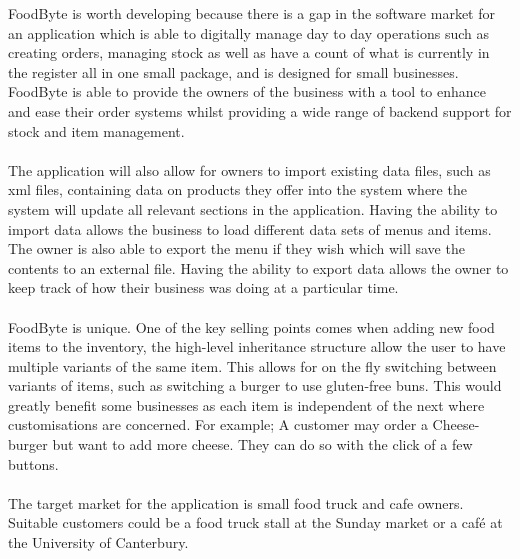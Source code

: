 FoodByte is worth developing because there is a gap in the software market for an application which is able to digitally manage day to day operations such as creating orders, managing stock as well as have a count of what is currently in the register all in one small package, and is designed for small businesses. FoodByte is able to provide the owners of the business with a tool to enhance and ease their order systems whilst providing a wide range of backend support for stock and item management.
\\ \\
The application will also allow for owners to import existing data files, such as xml files, containing data on products they offer into the system where the system will update all relevant sections in the application. Having the ability to import data allows the business to load different data sets of menus and items. The owner is also able to export the menu if they wish which will save the contents to an external file. Having the ability to export data allows the owner to keep track of how their business was doing at a particular time.
\\ \\
FoodByte is unique. One of the key selling points comes when adding new food items to the inventory, the high-level inheritance structure allow the user to have multiple variants of the same item. This allows for on the fly switching between variants of items, such as switching a burger to use gluten-free buns. This would greatly benefit some businesses as each item is independent of the next where customisations are concerned. For example; A customer may order a Cheese-burger but want to add more cheese. They can do so with the click of a few buttons.
\\ \\
The target market for the application is small food truck and cafe owners. Suitable customers could be a food truck stall at the Sunday market or a café at the University of Canterbury.